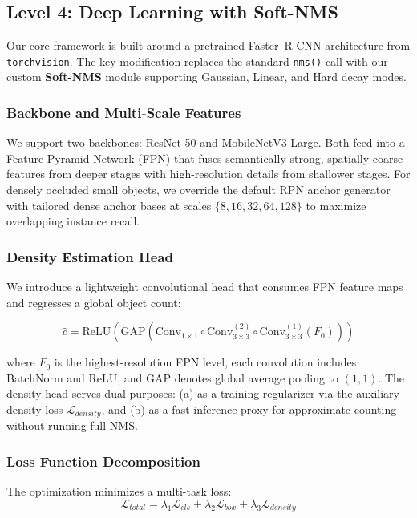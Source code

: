 \documentclass[conference]{IEEEtran}
\begin{document}
\subsection{Level 4: Deep Learning with Soft-NMS}
\label{sec:dl_model}

Our core framework is built around a pretrained Faster~R-CNN architecture
from \texttt{torchvision}. The key modification replaces the standard
\texttt{nms()} call with our custom \textbf{Soft-NMS} module supporting
Gaussian, Linear, and Hard decay modes.

\subsubsection{Backbone and Multi-Scale Features}
We support two backbones: ResNet-50 and MobileNetV3-Large. Both feed
into a Feature Pyramid Network (FPN) that fuses semantically strong,
spatially coarse features from deeper stages with high-resolution
details from shallower stages. For densely occluded small objects, we
override the default RPN anchor generator with tailored dense anchor
bases at scales $\{8, 16, 32, 64, 128\}$ to maximize overlapping
instance recall.

\subsubsection{Density Estimation Head}
\label{sec:density_head}

We introduce a lightweight convolutional head that consumes FPN
feature maps and regresses a global object count:

\begin{equation}
  \hat{c} = \text{ReLU}\!\left(\text{GAP}\!\left(
    \text{Conv}_{1\times1} \circ \text{Conv}_{3\times3}^{(2)} \circ
    \text{Conv}_{3\times3}^{(1)}(F_0)
  \right)\right)
  \label{eq:density_head}
\end{equation}

where $F_0$ is the highest-resolution FPN level, each convolution
includes BatchNorm and ReLU, and GAP denotes global average pooling
to $(1,1)$. The density head serves dual purposes: (a) as a training
regularizer via the auxiliary density loss $\mathcal{L}_{density}$,
and (b) as a fast inference proxy for approximate counting without
running full NMS.

\subsubsection{Loss Function Decomposition}
The optimization minimizes a multi-task loss:
\begin{equation}
   \mathcal{L}_{total} = \lambda_1 \mathcal{L}_{cls} + \lambda_2 \mathcal{L}_{box} + \lambda_3 \mathcal{L}_{density}
\end{equation}
\end{document}
